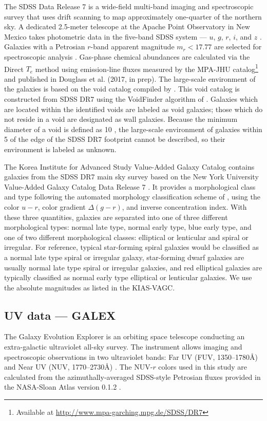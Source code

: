 The SDSS Data Release 7 \citep[DR7;][]{Abazajian09} is a wide-field multi-band 
imaging and spectroscopic survey that uses drift scanning to map approximately 
one-quarter of the northern sky.  A dedicated 2.5-meter telescope at the Apache 
Point Observatory in New Mexico takes photometric data in the five-band SDSS 
system --- $u$, $g$, $r$, $i$, and $z$ \citep{Fukugita96,Gunn98}.  Galaxies with 
a Petrosian $r$-band apparent magnitude $m_r < 17.77$ are selected for 
spectroscopic analysis \citep{Lupton01,Strauss02}.  Gas-phase chemical 
abundances are calculated via the Direct $T_e$ method using emission-line fluxes 
measured by the MPA-JHU catalog\footnote{Available at 
\url{http://www.mpa-garching.mpg.de/SDSS/DR7}} and published in Douglass et al. 
(2017, in prep).  The large-scale environment of the galaxies is based on the 
void catalog compiled by \cite{Pan12}.  This void catalog is constructed from 
SDSS DR7 using the VoidFinder algorithm of \cite{Hoyle02}.  Galaxies which are 
located within the identified voids are labeled as void galaxies; those which do 
not reside in a void are designated as wall galaxies.  Because the minimum 
diameter of a void is defined as 10 \hMpc , the large-scale environment of 
galaxies within 5 \hMpc of the edge of the SDSS DR7 footprint cannot be 
described, so their environment is labeled as unknown.

The Korea Institute for Advanced Study Value-Added Galaxy Catalog 
\citep[KIAS-VAGC;][]{Choi10} contains galaxies from the SDSS DR7 main sky survey 
based on the New York University Value-Added Galaxy Catalog Data Release 7 
\citep[NYU-VAGC;][]{Blanton05}.  It provides a morphological class and type 
following the automated morphology classification scheme of \cite{Park05}, using 
the color $u-r$, color gradient $\Delta (g-r)$, and inverse concentration index.  
With these three quantities, galaxies are separated into one of three different 
morphological types: normal late type, normal early type, blue early type, and 
one of two different morphological classes: elliptical or lenticular and spiral 
or irregular.  For reference, typical star-forming spiral galaxies would be 
classified as a normal late type spiral or irregular galaxy, star-forming dwarf 
galaxies are usually normal late type spiral or irregular galaxies, and red 
elliptical galaxies are typically classified as normal early type elliptical or 
lenticular galaxies.  We use the absolute magnitudes as listed in the KIAS-VAGC.

\subsection{UV data --- GALEX}\label{sec:GALEX}
The Galaxy Evolution Explorer \citep[GALEX]{Martin05} is an orbiting space 
telescope conducting an extra-galactic ultraviolet all-sky survey.  The 
instrument allows imaging and spectroscopic observations in two ultraviolet 
bands: Far UV (FUV, 1350--1780\AA) and Near UV (NUV, 1770--2730\AA) 
\citep{Morrissey07}.  The NUV-$r$ colors used in this study are calculated from 
the azimuthally-averaged SDSS-style Petrosian fluxes provided in the NASA-Sloan 
Atlas version 0.1.2 \citep[NSA]{Blanton11}.


